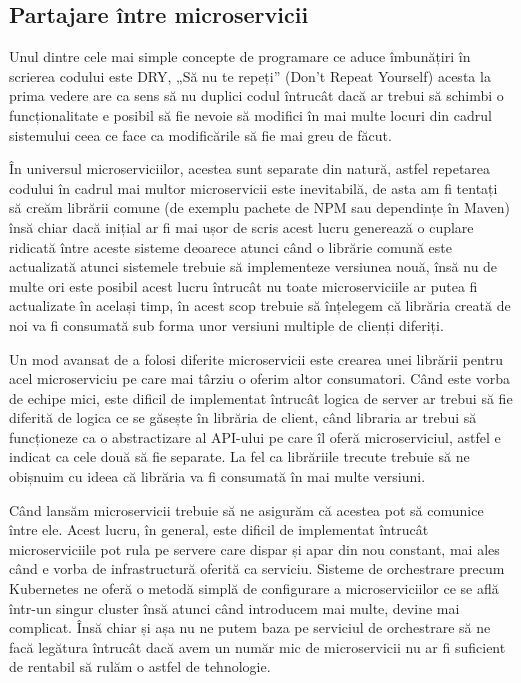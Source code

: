 \subsection{Partajare între microservicii}

Unul dintre cele mai simple concepte de programare ce aduce îmbunățiri în scrierea
codului este DRY, „Să nu te repeți” (Don't Repeat Yourself) acesta la prima vedere 
are ca sens să nu duplici codul întrucât dacă ar trebui să schimbi o funcționalitate
e posibil să fie nevoie să modifici în mai multe locuri din cadrul sistemului ceea ce face
ca modificările să fie mai greu de făcut.

În universul microserviciilor, acestea sunt separate din natură, astfel repetarea codului 
în cadrul mai multor microservicii este inevitabilă, de asta am fi tentați să creăm librării
comune (de exemplu pachete de NPM sau dependințe în Maven) însă chiar dacă inițial ar fi mai ușor de scris
acest lucru generează o cuplare ridicată între aceste sisteme deoarece atunci când o librărie comună
este actualizată atunci sistemele trebuie să implementeze versiunea nouă, însă nu de multe ori este
posibil acest lucru întrucât nu toate microserviciile ar putea fi actualizate în același timp,
în acest scop trebuie să înțelegem că librăria creată de noi va fi consumată sub forma unor 
versiuni multiple de clienți diferiți.

Un mod avansat de a folosi diferite microservicii este crearea unei librării pentru acel microserviciu
pe care mai târziu o oferim altor consumatori. Când este vorba de echipe mici, este dificil de implementat
întrucât logica de server ar trebui să fie diferită de logica ce se găsește în librăria de client,
când libraria ar trebui să funcționeze ca o abstractizare al API-ului pe care îl oferă microserviciul, astfel
e indicat ca cele două să fie separate. La fel ca librăriile trecute trebuie să ne obișnuim cu ideea
că librăria va fi consumată în mai multe versiuni.

Când lansăm microservicii trebuie să ne asigurăm că acestea pot să comunice între ele. Acest lucru,
în general, este dificil de implementat întrucât microserviciile pot rula pe servere care dispar și
apar din nou constant, mai ales când e vorba de infrastructură oferită ca serviciu. Sisteme de 
orchestrare precum Kubernetes ne oferă o metodă simplă de configurare a microserviciilor ce se află
într-un singur cluster însă atunci când introducem mai multe, devine mai complicat. Însă chiar și așa
nu ne putem baza pe serviciul de orchestrare să ne facă legătura întrucât dacă avem un număr 
mic de microservicii nu ar fi suficient de rentabil să rulăm o astfel de tehnologie.

